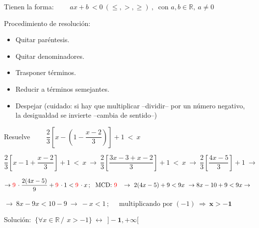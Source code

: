\begin{definition}

Tienen la forma: $\qquad ax+b \ < 0 \ (\leqslant, >, \geqslant)\  , \ \text{ con } a,b\in \mathbb R,\ a\neq 0$
	
\end{definition}

\begin{theorem}

Procedimiento de resolución:

\begin{itemize}
\vspace{-2mm} \item Quitar paréntesis.
\vspace{-2mm} \item Quitar denominadores.
\vspace{-2mm} \item Trasponer términos.
\vspace{-2mm} \item Reducir a términos semejantes.
\vspace{-2mm} \item Despejar (cuidado: si hay que multiplicar --dividir-- por un número negativo, la desigualdad se invierte --cambia de sentido--)	
\end{itemize}
	
\end{theorem}

\begin{miejemplo}

	Resuelve $\qquad \dfrac 2 3 \left[ x-\left( 1-\dfrac{x-2}{3} \right) \right]+1\ <\ x$
	
\vspace{5mm} $\dfrac 2 3 \left[ x- 1+\dfrac{x-2}{3}  \right]+1\ <\ x
\ \to \ 
\dfrac 2 3 \left[ \dfrac{3x-3+x-2}{3}  \right]+1\ <\ x \ \to \ 
\dfrac 2 3 \left[ \dfrac{4x-5}{3}  \right]+1 \ \to $

\vspace{2mm} $\to \textcolor{red}{9\, }\cdot \dfrac{2(4x-5)}{9} + \textcolor{red}{9\, }\cdot 1 < \textcolor{red}{9\, }\cdot x \, ; \ \ \text{MCD: \textcolor{red}{9\, }} \ \to \ 2(4x-5)+9<9x\ \to 8x-10+9<9x \to $

\vspace{2mm}$\to \ 8x-9x<10-9 \ \to \ -x<1\, ;\quad  \text{ multiplicando por } (-1) \ \Rightarrow \ \boldsymbol{x>-1}$

\vspace{2mm} Solución: $\ \{ \forall x \in \mathbb R \, / \, \ x>-1 \}\ \longleftrightarrow \ \ \boldsymbol{]-1,+\infty[}$
\end{miejemplo}

